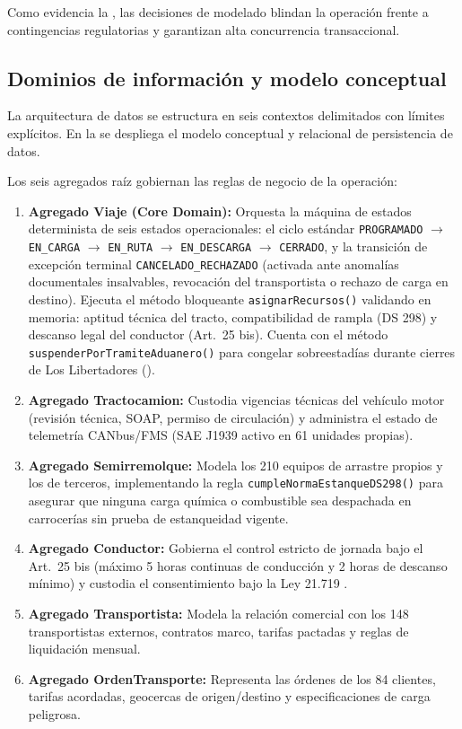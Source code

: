 Como evidencia la , las decisiones de modelado blindan la operación frente a contingencias regulatorias y garantizan alta concurrencia transaccional.

\subsection{Dominios de información y modelo conceptual}\label{sec:5-dominios}

La arquitectura de datos se estructura en seis contextos delimitados con límites explícitos. En la  se despliega el modelo conceptual y relacional de persistencia de datos.


Los seis agregados raíz gobiernan las reglas de negocio de la operación:
\begin{enumerate}
  \item \textbf{Agregado Viaje (Core Domain):} Orquesta la máquina de estados determinista de seis estados operacionales: el ciclo estándar \texttt{PROGRAMADO} $\to$ \texttt{EN\_CARGA} $\to$ \texttt{EN\_RUTA} $\to$ \texttt{EN\_DESCARGA} $\to$ \texttt{CERRADO}, y la transición de excepción terminal \texttt{CANCELADO\_RECHAZADO} (activada ante anomalías documentales insalvables, revocación del transportista o rechazo de carga en destino). Ejecuta el método bloqueante \texttt{asignarRecursos()} validando en memoria: aptitud técnica del tracto, compatibilidad de rampla (DS 298) y descanso legal del conductor (Art.~25 bis). Cuenta con el método \texttt{suspenderPorTramiteAduanero()} para congelar sobreestadías durante cierres de Los Libertadores ().
  \item \textbf{Agregado Tractocamion:} Custodia vigencias técnicas del vehículo motor (revisión técnica, SOAP, permiso de circulación) y administra el estado de telemetría CANbus/FMS (SAE J1939 activo en 61 unidades propias).
  \item \textbf{Agregado Semirremolque:} Modela los 210 equipos de arrastre propios y los de terceros, implementando la regla \texttt{cumpleNormaEstanqueDS298()} para asegurar que ninguna carga química o combustible sea despachada en carrocerías sin prueba de estanqueidad vigente.
  \item \textbf{Agregado Conductor:} Gobierna el control estricto de jornada bajo el Art.~25 bis (máximo 5 horas continuas de conducción y 2 horas de descanso mínimo) y custodia el consentimiento bajo la Ley 21.719 \parencite{ley21719}.
  \item \textbf{Agregado Transportista:} Modela la relación comercial con los 148 transportistas externos, contratos marco, tarifas pactadas y reglas de liquidación mensual.
  \item \textbf{Agregado OrdenTransporte:} Representa las órdenes de los 84 clientes, tarifas acordadas, geocercas de origen/destino y especificaciones de carga peligrosa.
\end{enumerate}

